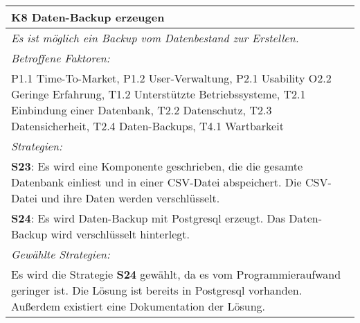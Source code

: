 {%
\begin{center}
\begin{minipage}{\linewidth}
    \centering
\renewcommand{\arraystretch}{1.5}
\begin{tabular}{|>{\centering\arraybackslash}p{15cm}|}
            \hline
           \textbf{K8 Daten-Backup erzeugen}\\ \hline
            \label{K8}
            \textit{Es ist möglich ein Backup vom Datenbestand zur Erstellen.}\\ \hline
            \textit{Betroffene Faktoren:} \\ 
P1.1 Time-To-Market, P1.2 User-Verwaltung, P2.1 Usability O2.2 Geringe Erfahrung, T1.2 Unterstützte Betriebssysteme, T2.1 Einbindung einer Datenbank, T2.2 Datenschutz, T2.3 Datensicherheit, T2.4 Daten-Backups, T4.1 Wartbarkeit
\\ \hline
	      \textit{Strategien:} \\ 
	\textbf{S23}: Es wird eine Komponente geschrieben, die die gesamte Datenbank einliest und in einer CSV-Datei abspeichert. Die CSV-Datei und ihre Daten werden verschlüsselt. \\
	\textbf{S24}: Es wird Daten-Backup mit Postgresql erzeugt. Das Daten-Backup wird verschlüsselt hinterlegt.
\\ \hline
	      \textit{Gewählte Strategien:} \\
Es wird die Strategie \textbf{S24} gewählt, da es vom Programmieraufwand geringer ist. Die Lösung ist bereits in Postgresql vorhanden. Außerdem existiert eine Dokumentation der Lösung.
\\ \hline
        \end{tabular}
\end{minipage}
\end{center}

}
